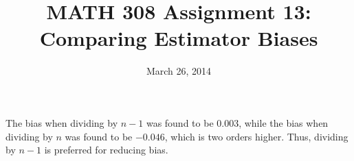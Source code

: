 \documentclass[]{article}
\title{MATH 308 Assignment 13:\\Comparing Estimator Biases}
\date{March 26, 2014}
\begin{document}
\maketitle
The bias when dividing by $n-1$ was found to be $0.003$, while the bias when dividing by $n$ was found to be $-0.046$, which is two orders higher. Thus, dividing by $n-1$ is preferred for reducing bias.
\end{document}
